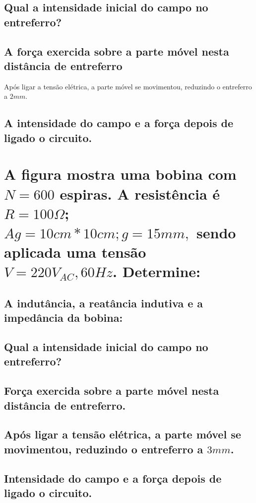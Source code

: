 \documentclass{article}
\begin{document}
\subsection{Qual a intensidade inicial do campo no entreferro?} %
\subsection{A força exercida sobre a parte móvel nesta distância de entreferro} %
Após ligar a tensão elétrica, a parte móvel se movimentou, reduzindo o entreferro a \(2mm\). 
\subsection{A intensidade do campo e a força depois de ligado o circuito.} %
\section{A figura mostra uma bobina com \(N=600\) espiras. A resistência é \(R=100\Omega\); \(Ag=10cm*10cm; g= 15mm,\) sendo aplicada uma tensão \(V=220V_{AC}, 60Hz\). Determine:} %
\subsection{A indutância, a reatância indutiva e a impedância da bobina:} %
\subsection{Qual a intensidade inicial do campo no entreferro?} %
\subsection{Força exercida sobre a parte móvel nesta distância de entreferro.} %
\subsection{Após ligar a tensão elétrica, a parte móvel se movimentou, reduzindo o entreferro a \(3mm\).} %
\subsection{Intensidade do campo e a força depois de ligado o circuito.} %
\end{document}
